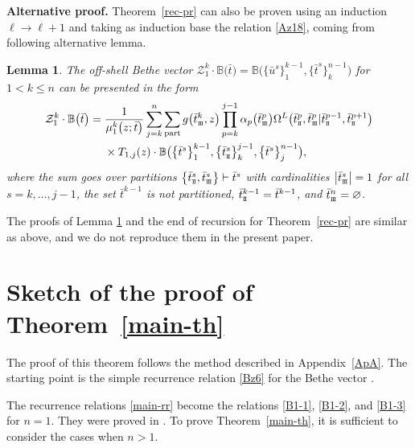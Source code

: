 \documentclass[10pt,a4paper]{amsart}
\newcommand{\st}{\scriptscriptstyle \rm I\hspace{-1pt}I}
\newcommand{\sth}{\scriptscriptstyle \rm I\hspace{-1pt}I\hspace{-1pt}I}
\newcommand{\bu}{\bar u}
\newcommand{\bt}{{\bar t}}
\newcommand{\bw}{\bar w}
\newtheorem{lem}[thm]{Lemma}
\theoremstyle{definition}
\def\BB{{\mathbb{B}}}
\def\r#1{\eqref{#1}}
\def\Z{\mathcal{Z}}
\def\Oml{\Omega^L}
\begin{document}
{\bf Alternative proof.}
Theorem~\ref{rec-pr} can also be proven using an induction $\ell\to \ell+1$ and
taking as induction base the relation \eqref{Az18}, coming from following alternative lemma.
\begin{lem}\label{r-pr}
The off-shell Bethe vector $\Z_{1}^{k}\cdot \BB\bigl(\bt\bigr)=\BB\bigl(\bigl\{\bu^s\bigr\}_1^{k-1},\bigl\{\bt^{s}\bigr\}_k^{n-1}\bigr)$ for $1<k\leq n$
can be presented in the form
\begin{align}
\Z_{1}^{k}\cdot \BB\bigl(\bt\bigr)={}&
\frac1{\mu_1^k\bigl(z;\bt\bigr)}
\sum_{j=k}^n \sum_{\rm part} g\bigl(\bt^{k}_{\sth},z\bigr)
\prod_{p=k}^{j-1}\alpha_p\bigl(\bt^p_{\sth}\bigr)
\Oml\bigl(\bt^p_{\st},\bt^p_{\sth}|\bt^{p-1}_{\st},\bt^{p+1}_{\st}\bigr)\nonumber\\
&\times T_{1,j}(z)\cdot\BB\bigl(\bigl\{\bt^s\bigr\}_1^{k-1},\bigl\{\bt^s_{\st}\bigr\}_{k}^{j-1},
\bigl\{\bt^s\bigr\}_j^{n-1}\bigr),\label{Az18}
\end{align}
where the sum goes over partitions $ \bigl\{\bt^s_{\st},\bt^s_{\sth}\bigr\}\vdash\bt^s$
with cardinalities $\big|\bt^s_{\sth}\big|=1$ for all $s=k,\dots,j-1$, the set $\bt^{k-1}$ is not partitioned, $\bt^{k-1}_{\st}=\bt^{k-1}$, and $\bt^{n}_{\sth} = \varnothing$.
\end{lem}
The proofs of Lemma \ref{r-pr} and the end of recursion for Theorem~\ref{rec-pr} are similar as above, and we do not reproduce them in the present paper.


\section[Sketch of the proof of Theorem 4.1]{Sketch of the proof of Theorem~\ref{main-th}}\label{ApB}

The proof of this theorem follows the method
described in Appendix~\ref{ApA}. The starting point is the simple
recurrence relation \r{Bz6} for the Bethe vector \smash{$\BB\bigl(\bigl\{\bw^s\bigr\}_0^{n-1}\bigr)$}.

The recurrence relations \r{main-rr} become the relations \r{B1-1}, \r{B1-2}, and
\r{B1-3} for $n=1$. They were proved in \cite{LPRS19}. To prove Theorem~\ref{main-th}, it is sufficient to consider the cases when $n>1$.
\end{document}
